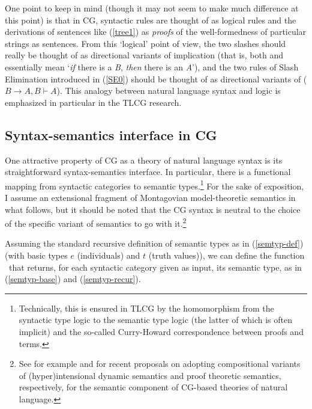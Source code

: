 \documentclass[output=paper]{langsci/langscibook}
\begin{document}
One point to keep in mind (though it may not seem to make much
difference at this point) is that in CG, syntactic rules are
thought of as logical rules and the derivations of sentences like
(\ref{tree1}) as \emph{proofs} of the well-formedness of
particular strings as sentences.
From this `logical' point of view, the two slashes should really be
thought of as directional variants of implication (that is, both
 and  essentially mean `\emph{if} there is a \textit{B},
\emph{then} there is an \textit{A}'), and the two rules of Slash Elimination
introduced in (\ref{SE0})
should be thought of as directional variants of 
($B \ensuremath{ \rightarrow } A, B  \ensuremath{\vdash\xspace } A$). This analogy between natural language
syntax and logic is emphasized in particular in the TLCG research.


\subsection{Syntax-semantics interface in CG \label{interface}}

One attractive property of CG as a theory of natural language syntax
is its straightforward syntax-semantics
interface. In particular, there is a 
functional mapping from syntactic categories to semantic
types.\footnote{Technically, this is ensured in TLCG by the 
homomorphism from the syntactic type logic to the semantic type logic
(the latter of which is often implicit) and the so-called Curry-Howard
correspondence between proofs and terms. } For
the sake of exposition, I assume an extensional fragment of
Montagovian model-theoretic semantics in what follows, but it should be noted that the
CG syntax is neutral to the choice of the specific variant of
semantics to go with it.\footnote{See for example \citet{martin2013} and
\citet{bekkimineshima17} for recent proposals on adopting compositional variants
of (hyper)intensional dynamic semantics and proof theoretic semantics,
respectively, for the semantic component of CG-based theories of
natural language.}

Assuming the standard recursive definition of semantic types
as in (\ref{semtyp-def}) (with basic types $e$ (individuals) and $t$ (truth
values)), we can define the function \SemTyp\ that returns, for each
syntactic category given as input, its semantic type, as in
(\ref{semtyp-base}) and (\ref{semtyp-recur}).
\end{document}
